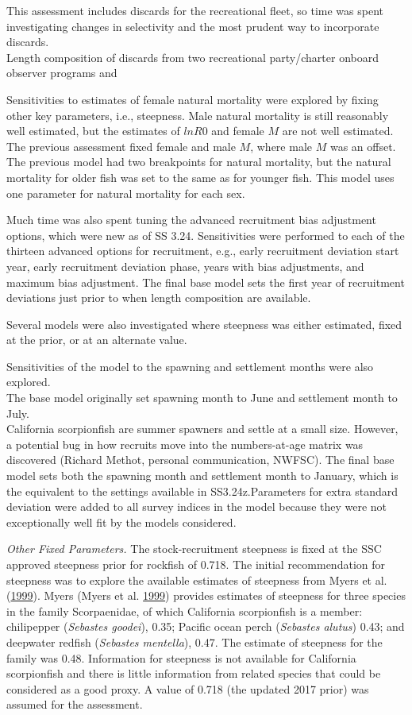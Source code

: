 \documentclass[12pt,]{article}
\begin{document}
This assessment includes discards for the recreational fleet, so time
was spent investigating changes in selectivity and the most prudent way
to incorporate discards.\\
Length composition of discards from two recreational party/charter
onboard observer programs and

Sensitivities to estimates of female natural mortality were explored by
fixing other key parameters, i.e., steepness. Male natural mortality is
still reasonably well estimated, but the estimates of \(lnR0\) and
female \(M\) are not well estimated. The previous assessment fixed
female and male \(M\), where male \(M\) was an offset. The previous
model had two breakpoints for natural mortality, but the natural
mortality for older fish was set to the same as for younger fish. This
model uses one parameter for natural mortality for each sex.

Much time was also spent tuning the advanced recruitment bias adjustment
options, which were new as of SS 3.24. Sensitivities were performed to
each of the thirteen advanced options for recruitment, e.g., early
recruitment deviation start year, early recruitment deviation phase,
years with bias adjustments, and maximum bias adjustment. The final base
model sets the first year of recruitment deviations just prior to when
length composition are available.

Several models were also investigated where steepness was either
estimated, fixed at the prior, or at an alternate value.

Sensitivities of the model to the spawning and settlement months were
also explored.\\
The base model originally set spawning month to June and settlement
month to July.\\
California scorpionfish are summer spawners and settle at a small size.
However, a potential bug in how recruits move into the numbers-at-age
matrix was discovered (Richard Methot, personal communication, NWFSC).
The final base model sets both the spawning month and settlement month
to January, which is the equivalent to the settings available in
SS3.24z.Parameters for extra standard deviation were added to all survey
indices in the model because they were not exceptionally well fit by the
models considered.

\emph{Other Fixed Parameters.} The stock-recruitment steepness is fixed
at the SSC approved steepness prior for rockfish of 0.718. The initial
recommendation for steepness was to explore the available estimates of
steepness from Myers et al. (\protect\hyperlink{ref-Myers1999}{1999}).
Myers (Myers et al. \protect\hyperlink{ref-Myers1999}{1999}) provides
estimates of steepness for three species in the family Scorpaenidae, of
which California scorpionfish is a member: chilipepper (\emph{Sebastes
goodei}), 0.35; Pacific ocean perch (\emph{Sebastes alutus}) 0.43; and
deepwater redfish (\emph{Sebastes mentella}), 0.47. The estimate of
steepness for the family was 0.48. Information for steepness is not
available for California scorpionfish and there is little information
from related species that could be considered as a good proxy. A value
of 0.718 (the updated 2017 prior) was assumed for the assessment.
\end{document}
